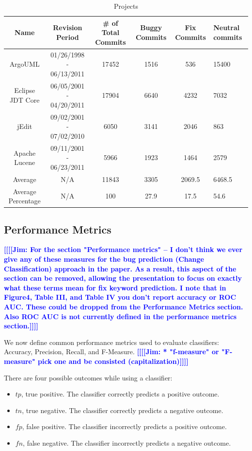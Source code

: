 \documentclass[10pt, conference, letterpaper, compsocconf]{IEEEtran}
\providecommand{\tabularnewline}{\\}
\newcommand{\todoc}[2]{{\textcolor{#1} {\textbf{[[#2]]}}}}
\newcommand{\todoblue}[1]{\todoc{blue}{\textbf{[[#1]]}}}
\newcommand{\jim}[1]{\todoblue{Jim: #1}}
\begin{document}
\begin{table}
\caption{Projects}
\center
\label{tab:projects}
\setlength{\extrarowheight}{2pt}

\begin{tabular}{|c|c|c|c|c|p{2.3cm}|}
\hline 
\textbf{Name}  & \textbf{Revision Period}  & \textbf{\# of Total Commits}& \textbf{Buggy Commits}& \textbf{Fix Commits}& \textbf{Neutral commits}\tabularnewline
\hline 
ArgoUML  & 01/26/1998 - 06/13/2011  & 17452 & 1516 & 536& 15400\tabularnewline
\hline 
Eclipse JDT Core  & 06/05/2001 - 04/20/2011  & 17904 & 6640 & 4232& 7032\tabularnewline
\hline 
jEdit  & 09/02/2001 - 07/02/2010  & 6050& 3141& 2046& 863\tabularnewline
\hline 
Apache Lucene  & 09/11/2001 - 06/23/2011  & 5966& 1923& 1464& 2579\tabularnewline
\hline
Average &N/A&11843&3305&2069.5&6468.5\tabularnewline
\hline
Average Percentage& N/A&100 &27.9&17.5&54.6\tabularnewline
\hline
\end{tabular}

\end{table}

\subsection{Performance Metrics}
\label{section:PerformanceMetrics}

\jim{For the section "Performance metrics" -- I don't think we ever give any of these measures for the bug prediction (Change Classification) approach in the paper. As a result, this aspect of the section can be removed, allowing the presentation to focus on exactly what these terms mean for fix keyword prediction. I note that in Figure4, Table III, and Table IV you don't report accuracy or ROC AUC. These could be dropped from the Performance Metrics section. Also ROC AUC is not currently defined in the performance metrics section.}

\par We now define common performance metrics used to evaluate classifiers:
Accuracy, Precision, Recall, and F-Measure.
\jim{* "f-measure" or "F-measure" pick one and be consisted (capitalization)}


There are four possible outcomes while using a classifier:
\begin{itemize}
  \item $tp$, true positive. The classifier correctly predicts a positive outcome.
  \item $tn$, true negative. The classifier correctly predicts a negative outcome.
  \item $fp$, false positive. The classifier incorrectly predicts a positive outcome.
  \item $fn$, false negative. The classifier incorrectly predicts a negative outcome.
\end{itemize}
\end{document}
